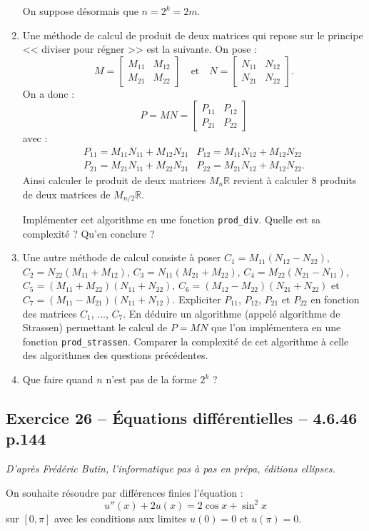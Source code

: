 \documentclass[10pt,fleqn]{article} %
\begin{document}
\begin{multicols}{2}
\begin{enumerate}
On suppose désormais que $n=2^k=2m$.
\item Une méthode de calcul de produit de deux matrices qui repose sur le principe << diviser pour régner >> est la suivante. On pose : 
$$
M=
\begin{bmatrix}
M_{11} & M_{12} \\
M_{21} & M_{22}
\end{bmatrix} 
\quad
\text{et}
\quad
N=
\begin{bmatrix}
N_{11} & N_{12} \\
N_{21} & N_{22}
\end{bmatrix} .
$$
On a donc :
$$
P=MN = 
\begin{bmatrix}
P_{11} & P_{12} \\
P_{21} & P_{22}
\end{bmatrix}
$$
avec :
$$
\begin{array}{ll}
P_{11} = M_{11}N_{11} + M_{12}N_{21} & 
P_{12} = M_{11}N_{12} + M_{12}N_{22} \\
P_{21} = M_{21}N_{11} + M_{22}N_{21} & 
P_{22} = M_{21}N_{12} + M_{12}N_{22}.
\end{array}
$$
Ainsi calculer le produit de deux matrices $M_n\mathbb{R}$ revient à calculer 8 produits de deux matrices de $M_{n/2}\mathbb{R}$.

Implémenter cet algorithme en une fonction \texttt{prod\_div}. Quelle est sa complexité ? Qu'en conclure ?
\item Une autre méthode de calcul consiste à poser 
$C_1 =M_{11}\left(N_{12} - N_{22} \right)$, 
$C_2 =N_{22}\left(M_{11} + M_{12} \right)$, 
$C_3 =N_{11}\left(M_{21} + M_{22}\right)$, 
$C_4 =M_{22}\left(N_{21} - N_{11} \right)$, 
$C_5 =\left(M_{11} + M_{22} \right) \left(N_{11} + N_{22} \right)$, 
$C_6 =\left(M_{12} - M_{22} \right)\left(N_{21} + N_{22} \right)$
et
$C_7 =\left(M_{11} - M_{21} \right)\left(N_{11} + N_{12} \right)$. Expliciter $P_{11}$, $P_{12}$, $P_{21}$ et $P_{22}$ en fonction des matrices $C_1$, ..., $C_7$. En déduire un algorithme (appelé algorithme de Strassen) permettant le calcul de $P=MN$ que l'on implémentera en une fonction \texttt{prod\_strassen}. Comparer la complexité de cet algorithme à celle des algorithmes des questions précédentes. 
\item Que faire quand $n$ n'est pas de la forme $2^k$ ?
\end{enumerate}


\subsection*{Exercice 26 -- Équations différentielles -- 4.6.46 p.144}
\begin{flushright}
\textit{D'après Frédéric Butin, l'informatique pas à pas en prépa, éditions ellipses.}
\end{flushright}
On souhaite résoudre par différences finies l'équation :
$$
u''(x)+2u(x) = 2 \cos x + \sin^2 x
$$
sur $[0,\pi]$ avec les conditions aux limites $u(0)=0$ et $u(\pi)=0$.


\end{multicols}
\end{document}
